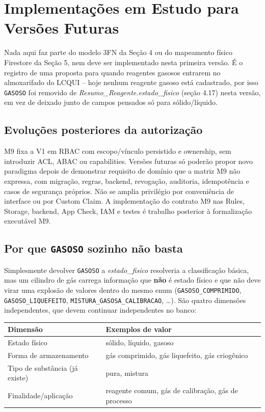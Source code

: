 \newpage
\section{Implementações em Estudo para Versões Futuras}

\begin{explicacao}
Nada aqui faz parte do modelo 3FN da Seção 4 ou do mapeamento físico Firestore da Seção 5, nem deve ser implementado nesta primeira versão. É o registro de uma proposta para quando reagentes gasosos entrarem no almoxarifado do LCQUI -- hoje nenhum reagente gasoso está cadastrado, por isso \texttt{GASOSO} foi removido de \textit{Resumo\_Reagente.estado\_fisico} (seção 4.17) nesta versão, em vez de deixado junto de campos pensados só para sólido/líquido.
\end{explicacao}

\subsection{Evoluções posteriores da autorização}
M9 fixa a V1 em RBAC com escopo/vínculo persistido e ownership, sem introduzir
ACL, ABAC ou capabilities. Versões futuras só poderão propor novo paradigma
depois de demonstrar requisito de domínio que a matriz M9 não expressa, com
migração, regras, backend, revogação, auditoria, idempotência e casos de
segurança próprios. Não se amplia privilégio por conveniência de interface ou
por Custom Claim. A implementação do contrato M9 nas Rules, Storage, backend,
App Check, IAM e testes é trabalho posterior à formalização executável M9.

\subsection{Por que \texttt{GASOSO} sozinho não basta}

Simplesmente devolver \texttt{GASOSO} a \textit{estado\_fisico} resolveria a classificação básica, mas um cilindro de gás carrega informação que \textbf{não} é estado físico e que não deve virar uma explosão de valores dentro do mesmo enum (\texttt{GASOSO\_COMPRIMIDO}, \texttt{GASOSO\_LIQUEFEITO}, \texttt{MISTURA\_GASOSA\_CALIBRACAO}, \ldots). São quatro dimensões independentes, que devem continuar independentes no banco:

\begin{center}
\begin{tabular}{p{}p{}}
\toprule
\textbf{Dimensão} & \textbf{Exemplos de valor} \\
\midrule
Estado físico & sólido, líquido, gasoso \\
Forma de armazenamento & gás comprimido, gás liquefeito, gás criogênico \\
Tipo de substância (já existe) & pura, mistura \\
Finalidade/aplicação & reagente comum, gás de calibração, gás de processo \\
\bottomrule
\end{tabular}
\end{center}

